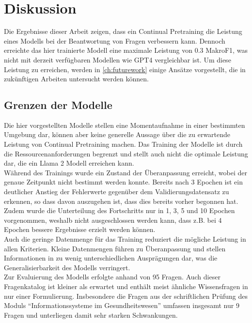 \chapter{Diskussion}\label{ch:discussion}
Die Ergebnisse dieser Arbeit zeigen, dass ein Continual Pretraining die Leistung eines Modells bei der Beantwortung von Fragen verbessern kann.
Dennoch erreichte das hier trainierte Modell eine maximale Leistung von \num{0.3} MakroF1, was nicht mit derzeit verfügbaren Modellen wie GPT4 vergleichbar ist.
Um diese Leistung zu erreichen, werden in \cref{ch:futurework} einige Ansätze vorgestellt, die in zukünftigen Arbeiten untersucht werden können.

\section{Grenzen der Modelle}
Die hier vorgestellten Modelle stellen eine Momentaufnahme in einer bestimmten Umgebung dar, können aber keine generelle Aussage über die zu erwartende Leistung von Continual Pretraining machen.
Das Training der Modelle ist durch die Ressourcenanforderungen begrenzt und stellt auch nicht die optimale Leistung dar, die ein Llama 2 Modell erreichen kann.\\

Während des Trainings wurde ein Zustand der Überanpassung erreicht, wobei der genaue Zeitpunkt nicht bestimmt werden konnte.
Bereits nach 3 Epochen ist ein deutlicher Anstieg der Fehlerwerte gegenüber dem Validierungsdatensatz zu erkennen, so dass davon auszugehen ist, dass dies bereits vorher begonnen hat.
Zudem wurde die Unterteilung des Fortschritts nur in 1, 3, 5 und 10 Epochen vorgenommen, weshalb nicht ausgeschlossen werden kann, dass z.B. bei 4 Epochen bessere Ergebnisse erzielt werden können.\\

Auch die geringe Datenmenge für das Training reduziert die mögliche Leistung in allen Kriterien.
Kleine Datenmengen führen zu Überanpassung und stellen Informationen in zu wenig unterschiedlichen Ausprägungen dar, was die Generalisierbarkeit des Modells verringert.\\

Zur Evaluierung des Modells erfolgte anhand von \num{95} Fragen.
Auch dieser Fragenkatalog ist kleiner als erwartet und enthält meist ähnliche Wissensfragen in nur einer Formulierung.
Insbesondere die Fragen aus der schriftlichen Prüfung des Moduls \enquote{Informationssysteme im Gesundheitswesen} umfassen insgesamt nur 9 Fragen und unterliegen damit sehr starken Schwankungen.\\

